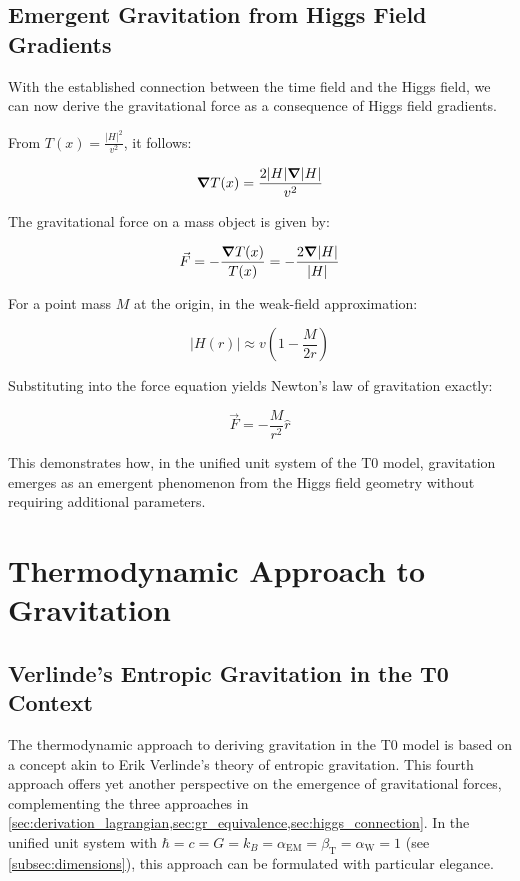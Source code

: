 \documentclass[12pt,a4paper]{article}
\newcommand{\Tfield}{T(x)}
\newcommand{\betaT}{\beta_{\text{T}}}
\newcommand{\alphaEM}{\alpha_{\text{EM}}}
\newcommand{\alphaW}{\alpha_{\text{W}}}
\begin{document}
	\subsection{Emergent Gravitation from Higgs Field Gradients}
	With the established connection between the time field and the Higgs field, we can now derive the gravitational force as a consequence of Higgs field gradients.
	
	From \(\Tfield = \frac{|H|^2}{v^2}\), it follows:
	
	\begin{equation}
		\grad \Tfield = \frac{2|H|\grad|H|}{v^2}
	\end{equation}
	
	The gravitational force on a mass object is given by:
	
	\begin{equation}
		\vec{F} = -\frac{\grad \Tfield}{\Tfield} = -\frac{2\grad|H|}{|H|}
	\end{equation}
	
	For a point mass \(M\) at the origin, in the weak-field approximation:
	
	\begin{equation}
		|H(r)| \approx v\left(1 - \frac{M}{2r}\right)
	\end{equation}
	
	Substituting into the force equation yields Newton's law of gravitation exactly:
	
	\begin{equation}
		\vec{F} = -\frac{M}{r^2} \hat{r}
	\end{equation}
	
	This demonstrates how, in the unified unit system of the T0 model, gravitation emerges as an emergent phenomenon from the Higgs field geometry without requiring additional parameters.
	
	\section{Thermodynamic Approach to Gravitation}
	\label{sec:thermodynamic}
	
	\subsection{Verlinde's Entropic Gravitation in the T0 Context}
	\label{subsec:verlinde}
	The thermodynamic approach to deriving gravitation in the T0 model is based on a concept akin to Erik Verlinde's theory of entropic gravitation. This fourth approach offers yet another perspective on the emergence of gravitational forces, complementing the three approaches in \cref{sec:derivation_lagrangian,sec:gr_equivalence,sec:higgs_connection}. In the unified unit system with \(\hbar = c = G = k_B = \alphaEM = \betaT = \alphaW = 1\) (see \cref{subsec:dimensions}), this approach can be formulated with particular elegance.
	
\end{document}
